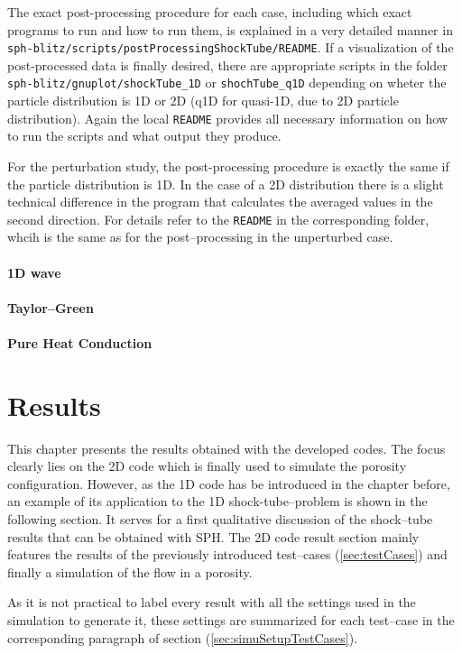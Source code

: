 \documentclass{report}
\begin{document}
The exact post-processing procedure for each case, including which exact programs to run and how to run them, is explained in a very detailed manner in {\tt sph-blitz/scripts/postProcessingShockTube/README}. If a visualization of the post-processed data is finally desired, there are appropriate scripts in the folder {\tt sph-blitz/gnuplot/shockTube\_1D} or {\tt shochTube\_q1D} depending on wheter the particle distribution is 1D or 2D (q1D for quasi-1D, due to 2D particle distribution).
Again the local {\tt README} provides all necessary information on how to run the scripts and what output they produce.

For the perturbation study, the post-processing procedure is exactly the same if the particle distribution is 1D. In the case of a 2D distribution there is a slight technical difference in the program that calculates the averaged values in the second direction. For details refer to the {\tt README} in the corresponding folder, whcih is the same as for the post--processing in the unperturbed case.




\subsubsection{1D wave}
\subsubsection{Taylor--Green}
\subsubsection{Pure Heat Conduction}

\chapter{Results}
This chapter presents the results obtained with the developed codes. The focus clearly lies on the 2D code which is finally used to simulate the porosity configuration. However, as the 1D code has be introduced in the chapter before, an example of its application to the 1D shock-tube--problem is shown in the following section. It serves for a first qualitative discussion of the shock--tube results that can be obtained with SPH.
The 2D code result section mainly features the results of the previously introduced test--cases (\ref{sec:testCases}) and finally a simulation of the flow in a porosity.

As it is not practical to label every result with all the settings used in the simulation to generate it, these settings are summarized for each test--case in the corresponding paragraph of section (\ref{sec:simuSetupTestCases}).
\end{document}
